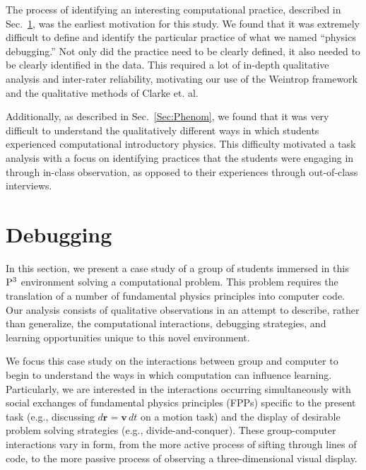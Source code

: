 \documentclass{msuphddissertation}
\begin{document}
\begin{doublespace}
The process of identifying an interesting computational practice, described in Sec.~\ref{Sec:Debug}, was the earliest motivation for this study.  We found that it was extremely difficult to define and identify the particular practice of what we named ``physics debugging.''  Not only did the practice need to be clearly defined, it also needed to be clearly identified in the data.  This required a lot of in-depth qualitative analysis and inter-rater reliability, motivating our use of the Weintrop framework and the qualitative methods of Clarke et. al.

Additionally, as described in Sec.~\ref{Sec:Phenom}, we found that it was very difficult to understand the qualitatively different ways in which students experienced computational introductory physics.  This difficulty motivated a task analysis with a focus on identifying practices that the students were engaging in through in-class observation, as opposed to their experiences through out-of-class interviews.
  
\section{Debugging}\label{Sec:Debug}

In this section, we present a case study of a group of students immersed in this ${\rm P}^{3}$ environment solving a computational problem.  This problem requires the translation of a number of fundamental physics principles into computer code.  Our analysis consists of qualitative observations in an attempt to describe, rather than generalize, the computational interactions, debugging strategies, and learning opportunities unique to this novel environment.

We focus this case study on the interactions between group and computer to begin to understand the ways in which computation can influence learning.  Particularly, we are interested in the interactions occurring simultaneously with social exchanges of fundamental physics principles (FPPs) specific to the present task (e.g., discussing $d\mathbf{r}=\mathbf{v}\,dt$ on a motion task) and the display of desirable problem solving strategies (e.g., divide-and-conquer).  These group-computer interactions vary in form, from the more active process of sifting through lines of code, to the more passive process of observing a three-dimensional visual display.


\end{doublespace}
\end{document}
